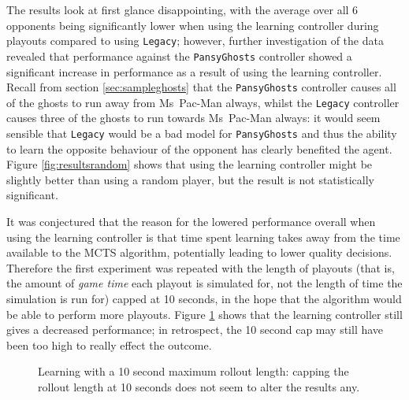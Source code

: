 The results look at first glance disappointing, with the average over all 6 opponents being significantly lower when using the learning controller during playouts compared to using {\tt Legacy}; however, further investigation of the data revealed that performance against the {\tt PansyGhosts} controller showed a significant increase in performance as a result of using the learning controller.  Recall from section \ref{sec:sampleghosts} that the {\tt PansyGhosts} controller causes all of the ghosts to run away from Ms~Pac-Man always, whilst the {\tt Legacy} controller causes three of the ghosts to run towards Ms~Pac-Man always: it would seem sensible that {\tt Legacy} would be a bad model for {\tt PansyGhosts} and thus the ability to learn the opposite behaviour of the opponent has clearly benefited the agent.  Figure \ref{fig:resultsrandom} shows that using the learning controller might be slightly better than using a random player, but the result is not statistically significant.

It was conjectured that the reason for the lowered performance overall when using the learning controller is that time spent learning takes away from the time available to the MCTS algorithm, potentially leading to lower quality decisions.  Therefore the first experiment was repeated with the length of playouts (that is, the amount of \emph{game time} each playout is simulated for, not the length of time the simulation is run for) capped at 10 seconds, in the hope that the algorithm would be able to perform more playouts.  Figure \ref{fig:resultssr} shows that the learning controller still gives a decreased performance; in retrospect, the 10 second cap may still have been too high to really effect the outcome.

\begin{figure}
\centering
{}
\caption[Learning with a 10 second maximum rollout length]{Learning with a 10 second maximum rollout length: capping the rollout length at 10 seconds does not seem to alter the results any.}
\label{fig:resultssr}
\end{figure}

